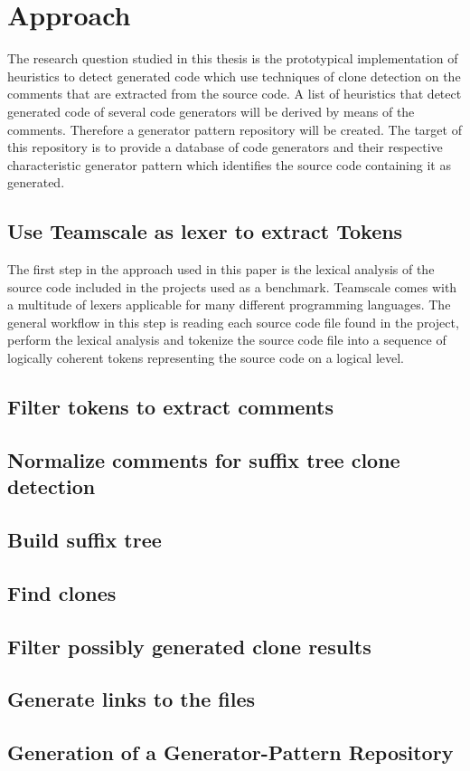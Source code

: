 
\chapter{Approach}\label{chapter:approach}
The research question studied in this thesis is the prototypical implementation of heuristics to detect generated code which use techniques of clone detection on the comments that are extracted from the source code. A list of heuristics that detect generated code of several code generators will be derived by means of the comments. Therefore a generator pattern repository will be created. The target of this repository is to provide a database of code generators and their respective characteristic generator pattern which identifies the source code containing it as generated.
\section{Use Teamscale as lexer to extract Tokens}
\begin{vwcol}[widths={0.8\textwidth,0.2\textwidth},
rule=0pt,indent=1em] 
The first step in the approach used in this paper is the lexical analysis of the source code included in the projects used as a benchmark. Teamscale comes with a multitude of lexers applicable for many different programming languages. The general workflow in this step is reading each source code file found in the project, perform the lexical analysis and tokenize the source code file into a sequence of logically coherent tokens representing the source code on a logical level.\\
\end{vwcol}

\section{Filter tokens to extract comments}
\section{Normalize comments for suffix tree clone detection}
\section{Build suffix tree}
\section{Find clones}
\section{Filter possibly generated clone results}
\section{Generate links to the files}
\section{Generation of a Generator-Pattern Repository}